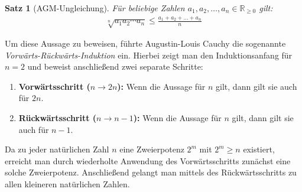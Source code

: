 \documentclass{article}
\newtheorem{thm}{Satz}
\theoremstyle{definition}
\begin{document}
\begin{thm}[AGM-Ungleichung]
Für beliebige Zahlen $a_1, a_2, \dots, a_n \in \mathbb{R}_{\ge 0}$ gilt:
\begin{align*}
    \sqrt[n]{a_1 a_2 \cdots a_n} \le \frac{a_1 + a_2 + \dots + a_n}{n}
\end{align*}
\end{thm}
Um diese Aussage zu beweisen, führte Augustin-Louis Cauchy die sogenannte \textit{Vorwärts-Rückwärts-Induktion} ein. Hierbei zeigt man den Induktionsanfang für $n=2$ und beweist anschließend zwei separate Schritte:
\begin{enumerate}
    \item \textbf{Vorwärtsschritt ($n \rightarrow 2n$):} Wenn die Aussage für $n$ gilt, dann gilt sie auch für $2n$.
    \item \textbf{Rückwärtsschritt ($n \rightarrow n-1$):} Wenn die Aussage für $n$ gilt, dann gilt sie auch für $n-1$.
\end{enumerate}
Da zu jeder natürlichen Zahl $n$ eine Zweierpotenz $2^m$ mit $2^m \ge n$ existiert, erreicht man durch wiederholte Anwendung des Vorwärtsschritts zunächst eine solche Zweierpotenz. Anschließend gelangt man mittels des Rückwärtsschritts zu allen kleineren natürlichen Zahlen.
\end{document}
